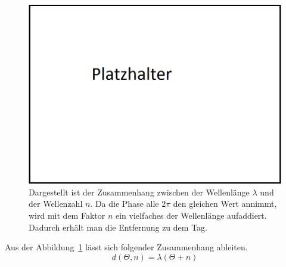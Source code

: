 \begin{figure} [h]
\centering
         \caption[Zusammenhang Wellenlänge - Wellenzahl]{Dargestellt ist der Zusammenhang zwischen der Wellenlänge $\lambda$ und der Wellenzahl $n$. Da die Phase alle $2\pi$ den gleichen Wert annimmt, wird mit dem Faktor $n$ ein vielfaches der Wellenlänge aufaddiert. Dadurch erhält man die Entfernung zu dem Tag.}
         \label{fig:wavenumber_wavelength}
         \vspace{0.5cm}
         \includegraphics[width=\textwidth]{img/00_placeholder.png}
%      
\end{figure}

Aus der Abbildung~\ref{fig:wavenumber_wavelength} lässt sich folgender Zusammenhang ableiten.
%
\begin{equation}
\label{eq:Phase_Wavenumber}
	d(\Theta, n)=\lambda(\Theta+n)
\end{equation}

\lipsum[1]